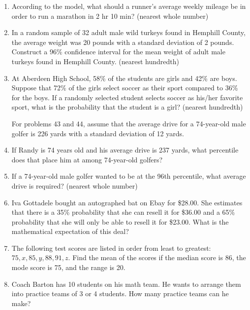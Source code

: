 \documentclass[../uilmath.tex]{subfiles}
\begin{document}
\begin{enumerate}[label=\bfseries\arabic*.]
    \item %
    According to the model, what should a runner's average weekly mileage be in order to run a marathon in 2 hr 10 min? (nearest whole number)

    \item %
    In a random sample of 32 adult male wild turkeys found in Hemphill County, the average weight was 20 pounds with a standard deviation of 2 pounds.
    Construct a 96\% confidence interval for the mean weight of adult male turkeys found in Hemphill County. (nearest hundredth)

    \item %
    At Aberdeen High School, 58\% of the students are girls and 42\% are boys. Suppose that 72\% of the girls select soccer as their 
    sport compared to 36\% for the boys. If a randomly selected student selects soccer as his/her favorite sport, what is the probability that the student is a girl? (nearest hundredth)

    
    For problems 43 and 44, assume that the average drive for a 74-year-old male golfer is 226 yards with a standard deviation of 12 yards.
    \item %
    If Randy is 74 years old and his average drive is 237 yards, what percentile does that place him at among 74-year-old golfers?

    \item %
    If a 74-year-old male golfer wanted to be at the 96th percentile, what average drive is required? (nearest whole number)

    \item %
    Iva Gottadele bought an autographed bat on Ebay for \$28.00. She estimates that there is a 35\% probability
    that she can resell it for \$36.00 and a 65\% probability that she will only be able to resell it for \$23.00.
    What is the mathematical expectation of this deal?

    \item %
    The following test scores are listed in order from least to greatest: $75,x,85,y,88,91,z$.
    Find the mean of the scores if the median score is 86, the mode score is 75, and the range is 20.

    \item %
    Coach Barton has 10 students on his math team. He wants to arrange them into practice teams 
    of 3 or 4 students. How many practice teams can he make?


\end{enumerate}
\end{document}
